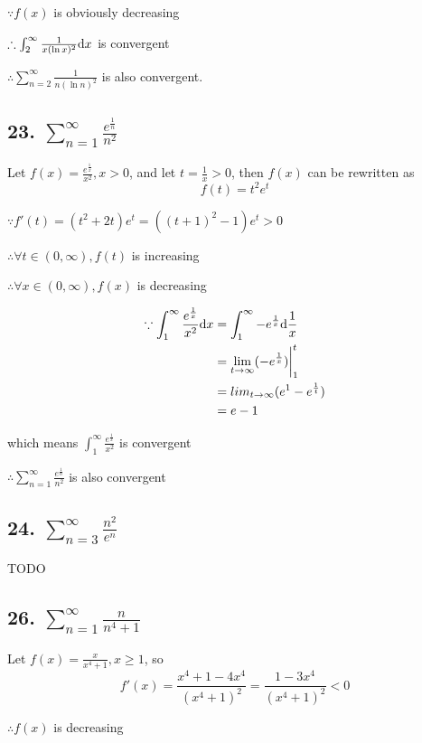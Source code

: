 \documentclass{article}
\begin{document}
    $\because f(x)$ is obviously decreasing

    $\therefore \int_2^\infty \frac{1}{x(\ln x)^2} \textrm dx $ is convergent

    $\therefore \sum_{n=2}^\infty \frac{1}{n(\ln n)^2}$ is also convergent.

    \subsection*{23. $\sum_{n=1}^\infty \frac{e^{\frac 1 n}}{n^2}$}

    Let $f(x) = \frac{e^{\frac 1 x}}{x^2}, x > 0$, and let $t = \frac 1 x > 0$, then $f(x)$ can be rewritten as $$f(t) = t^2e^t$$

    $\because f'(t) = (t^2+2t)e^t = ((t+1)^2-1)e^t > 0$

    $\therefore \forall t \in (0, \infty), f(t)$ is increasing

    $\therefore \forall x \in (0, \infty), f(x)$ is decreasing

    $$\begin{aligned}
        \because \int_1^\infty \frac{e^{\frac 1 x}}{x^2} \textrm dx &= \int_1^\infty -e^{\frac 1 x}\textrm d\frac 1 x \\
        &= \lim_{t\to\infty}(-e^{\frac 1 x})\biggl|_1^t \\
        &= lim_{t\to\infty} (e^1 - e^{\frac 1 t}) \\
        &= e - 1
    \end{aligned}$$

    which means $\int_1^\infty \frac{e^{\frac 1 x}}{x^2}$ is convergent

    $\therefore \sum_{n=1}^\infty \frac{e^{\frac 1 n}}{n^2}$ is also convergent

    \subsection*{24. $\sum_{n=3}^\infty \frac{n^2}{e^n}$}

    TODO

    \subsection*{26. $\sum_{n=1}^\infty \frac{n}{n^4+1}$}

    Let $f(x) = \frac{x}{x^4+1}, x \geq 1$, so $$f'(x) = \frac{x^4+1 - 4x^4}{(x^4+1)^2} = \frac{1 - 3x^4}{(x^4+1)^2} < 0$$

    $\therefore f(x)$ is decreasing
\end{document}

